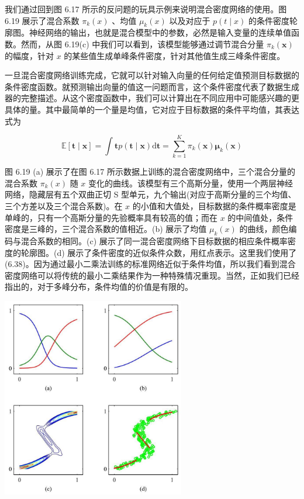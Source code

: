 \documentclass[10pt]{article}
\begin{document}
我们通过回到图 6.17 所示的反问题的玩具示例来说明混合密度网络的使用。图 6.19 展示了混合系数 \({\pi }_{k}\left( x\right)\) 、均值 \({\mu }_{k}\left( x\right)\) 以及对应于 \(p\left( {t \mid  x}\right)\) 的条件密度轮廓图。神经网络的输出，也就是混合模型中的参数，必然是输入变量的连续单值函数。然而，从图 6.19(c) 中我们可以看到，该模型能够通过调节混合分量 \({\pi }_{k}\left( \mathbf{x}\right)\) 的幅度，针对 \(x\) 的某些值生成单峰条件密度，针对其他值生成三峰条件密度。

一旦混合密度网络训练完成，它就可以针对输入向量的任何给定值预测目标数据的条件密度函数。就预测输出向量的值这一问题而言，这个条件密度代表了数据生成器的完整描述。从这个密度函数中，我们可以计算出在不同应用中可能感兴趣的更具体的量。其中最简单的一个量是均值，它对应于目标数据的条件平均值，其表达式为

\[
\mathbb{E}\left\lbrack  {\mathbf{t} \mid  \mathbf{x}}\right\rbrack   = \int \mathbf{t}p\left( {\mathbf{t} \mid  \mathbf{x}}\right) \mathrm{d}\mathbf{t} = \mathop{\sum }\limits_{{k = 1}}^{K}{\pi }_{k}\left( \mathbf{x}\right) {\mathbf{\mu }}_{k}\left( \mathbf{x}\right)  \tag{6.48}
\]

图 6.19 (a) 展示了在图 6.17 所示数据上训练的混合密度网络中，三个混合分量的混合系数 \({\pi }_{k}\left( x\right)\) 随 \(x\) 变化的曲线。该模型有三个高斯分量，使用一个两层神经网络，隐藏层有五个双曲正切 S 型单元，九个输出(对应于高斯分量的三个均值、三个方差以及三个混合系数)。在 \(x\) 的小值和大值处，目标数据的条件概率密度是单峰的，只有一个高斯分量的先验概率具有较高的值；而在 \(x\) 的中间值处，条件密度是三峰的，三个混合系数的值相近。(b) 展示了均值 \({\mu }_{k}\left( x\right)\) 的曲线，颜色编码与混合系数的相同。(c) 展示了同一混合密度网络下目标数据的相应条件概率密度的轮廓图。(d) 展示了条件密度的近似条件众数，用红点表示。这里我们使用了 (6.38)。因为通过最小二乘法训练的标准网络近似于条件均值，所以我们看到混合密度网络可以将传统的最小二乘结果作为一种特殊情况重现。当然，正如我们已经指出的，对于多峰分布，条件均值的价值是有限的。

\begin{center}
\includegraphics[max width=0.6\textwidth]{images/0194e279-9b28-703a-88f4-c3ac21e2010d_222_691_351_820_898_0.jpg}
\end{center}
\hspace*{3em} 
\end{document}
